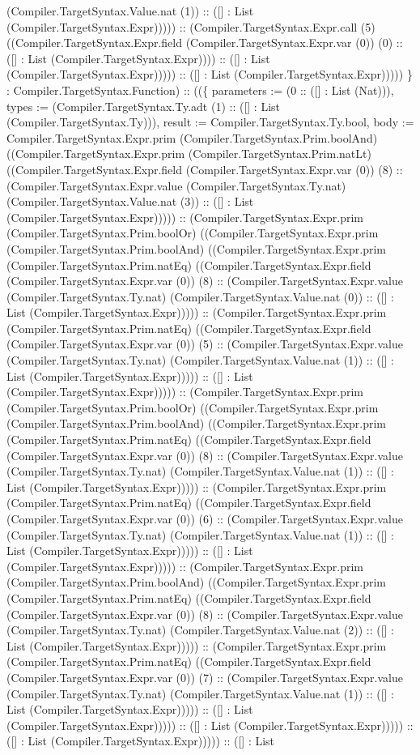 \documentclass[11pt]{article}
\begin{document}
(Compiler.TargetSyntax.Value.nat (1)) :: ([] : List (Compiler.TargetSyntax.Expr))))) :: (Compiler.TargetSyntax.Expr.call (5) ((Compiler.TargetSyntax.Expr.field (Compiler.TargetSyntax.Expr.var (0)) (0) :: ([] : List (Compiler.TargetSyntax.Expr)))) :: ([] : List (Compiler.TargetSyntax.Expr))))) :: ([] : List (Compiler.TargetSyntax.Expr))))) \} : Compiler.TargetSyntax.Function) :: ((\{ parameters := (0 :: ([] : List (Nat))), types := (Compiler.TargetSyntax.Ty.adt (1) :: ([] : List (Compiler.TargetSyntax.Ty))), result := Compiler.TargetSyntax.Ty.bool, body := Compiler.TargetSyntax.Expr.prim (Compiler.TargetSyntax.Prim.boolAnd) ((Compiler.TargetSyntax.Expr.prim (Compiler.TargetSyntax.Prim.natLt) ((Compiler.TargetSyntax.Expr.field (Compiler.TargetSyntax.Expr.var (0)) (8) :: (Compiler.TargetSyntax.Expr.value (Compiler.TargetSyntax.Ty.nat) (Compiler.TargetSyntax.Value.nat (3)) :: ([] : List (Compiler.TargetSyntax.Expr))))) :: (Compiler.TargetSyntax.Expr.prim (Compiler.TargetSyntax.Prim.boolOr) ((Compiler.TargetSyntax.Expr.prim (Compiler.TargetSyntax.Prim.boolAnd) ((Compiler.TargetSyntax.Expr.prim (Compiler.TargetSyntax.Prim.natEq) ((Compiler.TargetSyntax.Expr.field (Compiler.TargetSyntax.Expr.var (0)) (8) :: (Compiler.TargetSyntax.Expr.value (Compiler.TargetSyntax.Ty.nat) (Compiler.TargetSyntax.Value.nat (0)) :: ([] : List (Compiler.TargetSyntax.Expr))))) :: (Compiler.TargetSyntax.Expr.prim (Compiler.TargetSyntax.Prim.natEq) ((Compiler.TargetSyntax.Expr.field (Compiler.TargetSyntax.Expr.var (0)) (5) :: (Compiler.TargetSyntax.Expr.value (Compiler.TargetSyntax.Ty.nat) (Compiler.TargetSyntax.Value.nat (1)) :: ([] : List (Compiler.TargetSyntax.Expr))))) :: ([] : List (Compiler.TargetSyntax.Expr))))) :: (Compiler.TargetSyntax.Expr.prim (Compiler.TargetSyntax.Prim.boolOr) ((Compiler.TargetSyntax.Expr.prim (Compiler.TargetSyntax.Prim.boolAnd) ((Compiler.TargetSyntax.Expr.prim (Compiler.TargetSyntax.Prim.natEq) ((Compiler.TargetSyntax.Expr.field (Compiler.TargetSyntax.Expr.var (0)) (8) :: (Compiler.TargetSyntax.Expr.value (Compiler.TargetSyntax.Ty.nat) (Compiler.TargetSyntax.Value.nat (1)) :: ([] : List (Compiler.TargetSyntax.Expr))))) :: (Compiler.TargetSyntax.Expr.prim (Compiler.TargetSyntax.Prim.natEq) ((Compiler.TargetSyntax.Expr.field (Compiler.TargetSyntax.Expr.var (0)) (6) :: (Compiler.TargetSyntax.Expr.value (Compiler.TargetSyntax.Ty.nat) (Compiler.TargetSyntax.Value.nat (1)) :: ([] : List (Compiler.TargetSyntax.Expr))))) :: ([] : List (Compiler.TargetSyntax.Expr))))) :: (Compiler.TargetSyntax.Expr.prim (Compiler.TargetSyntax.Prim.boolAnd) ((Compiler.TargetSyntax.Expr.prim (Compiler.TargetSyntax.Prim.natEq) ((Compiler.TargetSyntax.Expr.field (Compiler.TargetSyntax.Expr.var (0)) (8) :: (Compiler.TargetSyntax.Expr.value (Compiler.TargetSyntax.Ty.nat) (Compiler.TargetSyntax.Value.nat (2)) :: ([] : List (Compiler.TargetSyntax.Expr))))) :: (Compiler.TargetSyntax.Expr.prim (Compiler.TargetSyntax.Prim.natEq) ((Compiler.TargetSyntax.Expr.field (Compiler.TargetSyntax.Expr.var (0)) (7) :: (Compiler.TargetSyntax.Expr.value (Compiler.TargetSyntax.Ty.nat) (Compiler.TargetSyntax.Value.nat (1)) :: ([] : List (Compiler.TargetSyntax.Expr))))) :: ([] : List (Compiler.TargetSyntax.Expr))))) :: ([] : List (Compiler.TargetSyntax.Expr))))) :: ([] : List (Compiler.TargetSyntax.Expr))))) :: ([] : List 
\end{document}
